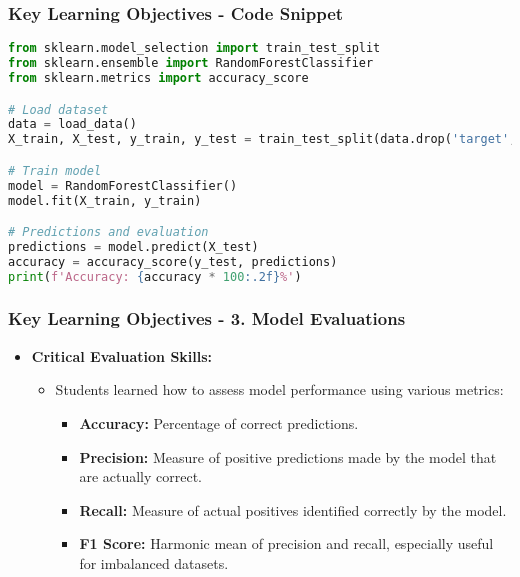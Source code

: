 \documentclass[aspectratio=169]{beamer}
\begin{document}
\begin{frame}[fragile]
    \frametitle{Key Learning Objectives - Code Snippet}
    \begin{lstlisting}[language=Python]
from sklearn.model_selection import train_test_split
from sklearn.ensemble import RandomForestClassifier
from sklearn.metrics import accuracy_score

# Load dataset
data = load_data() 
X_train, X_test, y_train, y_test = train_test_split(data.drop('target', axis=1), data['target'], test_size=0.2)

# Train model
model = RandomForestClassifier()
model.fit(X_train, y_train)

# Predictions and evaluation
predictions = model.predict(X_test)
accuracy = accuracy_score(y_test, predictions)
print(f'Accuracy: {accuracy * 100:.2f}%')
    \end{lstlisting}
\end{frame}

\begin{frame}[fragile]
    \frametitle{Key Learning Objectives - 3. Model Evaluations}
    \begin{itemize}
        \item \textbf{Critical Evaluation Skills:}
        \begin{itemize}
            \item Students learned how to assess model performance using various metrics:
            \begin{itemize}
                \item \textbf{Accuracy:} Percentage of correct predictions.
                \item \textbf{Precision:} Measure of positive predictions made by the model that are actually correct.
                \item \textbf{Recall:} Measure of actual positives identified correctly by the model.
                \item \textbf{F1 Score:} Harmonic mean of precision and recall, especially useful for imbalanced datasets.
            \end{itemize}
        \end{itemize}
    \end{itemize}
\end{frame}
\end{document}
